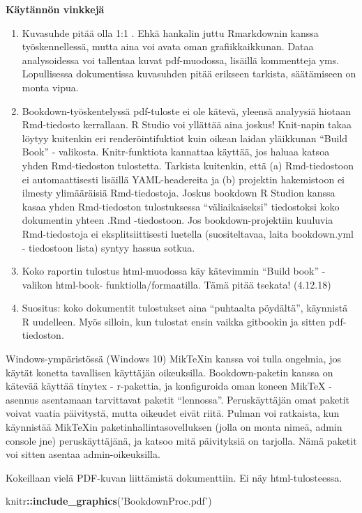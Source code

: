 \documentclass[finnish,]{book}
\newenvironment{Shaded}{\begin{snugshade}}{\end{snugshade}}
\newcommand{\KeywordTok}[1]{\textcolor[rgb]{0.13,0.29,0.53}{\textbf{#1}}}
\newcommand{\NormalTok}[1]{#1}
\newcommand{\OperatorTok}[1]{\textcolor[rgb]{0.81,0.36,0.00}{\textbf{#1}}}
\newcommand{\StringTok}[1]{\textcolor[rgb]{0.31,0.60,0.02}{#1}}
\begin{document}
\textbf{Käytännön vinkkejä}

\begin{enumerate}
\def\labelenumi{\arabic{enumi}.}
\item
  Kuvasuhde pitää olla 1:1 . Ehkä hankalin juttu Rmarkdownin kanssa työskennellessä, mutta aina voi avata oman grafiikkaikkunan. Dataa analysoidessa voi tallentaa kuvat pdf-muodossa, lisäillä kommentteja yms. Lopullisessa dokumentissa kuvasuhden pitää erikseen tarkista, säätämiseen on monta vipua.
\item
  Bookdown-työskentelyssä pdf-tuloste ei ole kätevä, yleensä analyysiä hiotaan Rmd-tiedosto kerrallaan. R Studio voi yllättää aina joskus! Knit-napin takaa löytyy kuitenkin eri renderöintifuktiot kuin oikean laidan yläikkunan ``Build Book'' - valikosta. Knitr-funktiota kannattaa käyttää, jos haluaa katsoa yhden Rmd-tiedoston tulostetta. Tarkista kuitenkin, että (a) Rmd-tiedostoon ei automaattisesti lisäillä YAML-headereita ja (b) projektin hakemistoon ei ilmesty ylimääräisiä Rmd-tiedostoja. Joskus bookdown R Studion kanssa kasaa yhden Rmd-tiedoston tulostuksessa ``väliaikaiseksi'' tiedostoksi koko dokumentin yhteen .Rmd -tiedostoon. Jos bookdown-projektiin kuuluvia Rmd-tiedostoja ei eksplitsiittisesti luetella (suositeltavaa, laita bookdown.yml - tiedostoon lista) syntyy hassua sotkua.
\item
  Koko raportin tulostus html-muodossa käy kätevimmin ``Build book'' - valikon html-book- funktiolla/formaatilla. Tämä pitää tsekata! (4.12.18)
\item
  Suositus: koko dokumentit tulostukset aina ``puhtaalta pöydältä'', käynnistä R uudelleen. Myös silloin, kun tulostat ensin vaikka gitbookin ja sitten pdf-tiedoston.
\end{enumerate}

Windows-ympäristössä (Windows 10) MikTeXin kanssa voi tulla ongelmia, jos käytät konetta tavallisen käyttäjän oikeuksilla. Bookdown-paketin kanssa on kätevää käyttää tinytex - r-pakettia, ja konfiguroida oman koneen MikTeX - asennus asentamaan tarvittavat paketit ``lennossa''. Peruskäyttäjän omat paketit voivat vaatia päivitystä, mutta oikeudet eivät riitä. Pulman voi ratkaista, kun käynnistää MikTeXin paketinhallintasovelluksen (jolla on monta nimeä, admin console jne) peruskäyttäjänä, ja katsoo mitä päivityksiä on tarjolla. Nämä paketit voi sitten asentaa admin-oikeuksilla.

Kokeillaan vielä PDF-kuvan liittämistä dokumenttiin. Ei näy html-tulosteessa.

\begin{Shaded}
\begin{Highlighting}[]
\NormalTok{knitr}\OperatorTok{::}\KeywordTok{include_graphics}\NormalTok{(}\StringTok{'BookdownProc.pdf'}\NormalTok{)}
\end{Highlighting}
\end{Shaded}
\end{document}
